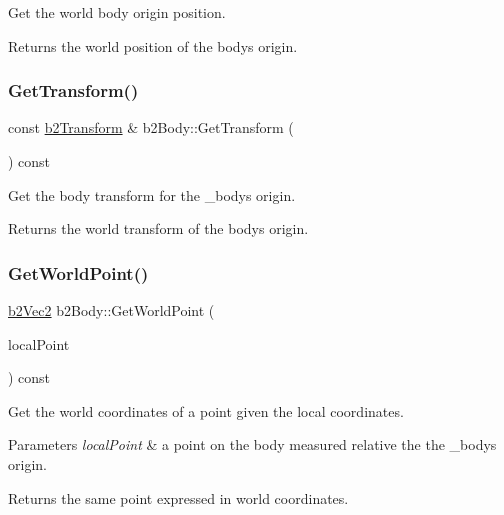 Get the world body origin position. \begin{DoxyReturn}{Returns}
the world position of the body\textquotesingle{}s origin. 
\end{DoxyReturn}
\mbox{\label{classb2Body_afb316448e6e555ceb2df23ed216b2f53}} 
\subsubsection{\texorpdfstring{Get\+Transform()}{GetTransform()}}
{\footnotesize\ttfamily const \mbox{\hyperlink{structb2Transform}{b2\+Transform}} \& b2\+Body\+::\+Get\+Transform (\begin{DoxyParamCaption}{ }\end{DoxyParamCaption}) const\hspace{0.3cm}{\ttfamily [inline]}}

Get the body transform for the _body\textquotesingle{}s origin. \begin{DoxyReturn}{Returns}
the world transform of the body\textquotesingle{}s origin. 
\end{DoxyReturn}
\mbox{\label{classb2Body_a712b782c61963c6f07beca86acc631ae}} 
\subsubsection{\texorpdfstring{Get\+World\+Point()}{GetWorldPoint()}}
{\footnotesize\ttfamily \mbox{\hyperlink{structb2Vec2}{b2\+Vec2}} b2\+Body\+::\+Get\+World\+Point (\begin{DoxyParamCaption}\item[{const \mbox{\hyperlink{structb2Vec2}{b2\+Vec2}} \&}]{local\+Point }\end{DoxyParamCaption}) const\hspace{0.3cm}{\ttfamily [inline]}}

Get the world coordinates of a point given the local coordinates. 
\begin{DoxyParams}{Parameters}
{\em local\+Point} & a point on the body measured relative the the _body\textquotesingle{}s origin. \\
\hline
\end{DoxyParams}
\begin{DoxyReturn}{Returns}
the same point expressed in world coordinates. 
\end{DoxyReturn}
\mbox{\label{classb2Body_ae8c434785b2a730f7c385e708b345bb6}} 
